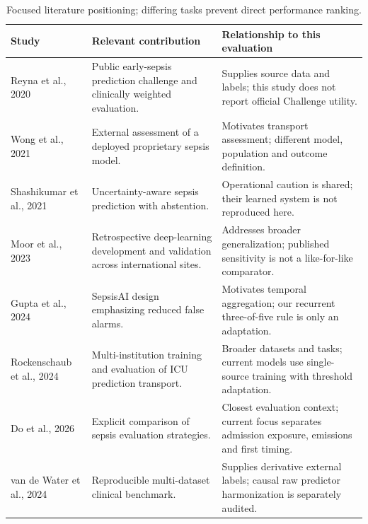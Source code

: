 \begin{table}[htbp]
\centering\small
\renewcommand{\arraystretch}{1.2}
\caption{Focused literature positioning; differing tasks prevent direct performance ranking.}\label{tab:sliterature}
\begin{tabular}{p{.19\linewidth}p{.35\linewidth}p{.36\linewidth}}
\toprule
Study & Relevant contribution & Relationship to this evaluation \\
\midrule
Reyna et al., 2020 \cite{reyna} & Public early-sepsis prediction challenge and clinically weighted evaluation. & Supplies source data and labels; this study does not report official Challenge utility. \\
Wong et al., 2021 \cite{wong} & External assessment of a deployed proprietary sepsis model. & Motivates transport assessment; different model, population and outcome definition. \\
Shashikumar et al., 2021 \cite{composer} & Uncertainty-aware sepsis prediction with abstention. & Operational caution is shared; their learned system is not reproduced here. \\
Moor et al., 2023 \cite{moor} & Retrospective deep-learning development and validation across international sites. & Addresses broader generalization; published sensitivity is not a like-for-like comparator. \\
Gupta et al., 2024 \cite{gupta} & SepsisAI design emphasizing reduced false alarms. & Motivates temporal aggregation; our recurrent three-of-five rule is only an adaptation. \\
Rockenschaub et al., 2024 \cite{rockenschaub} & Multi-institution training and evaluation of ICU prediction transport. & Broader datasets and tasks; current models use single-source training with threshold adaptation. \\
Do et al., 2026 \cite{do} & Explicit comparison of sepsis evaluation strategies. & Closest evaluation context; current focus separates admission exposure, emissions and first timing. \\
van de Water et al., 2024 \cite{yaib} & Reproducible multi-dataset clinical benchmark. & Supplies derivative external labels; causal raw predictor harmonization is separately audited. \\
\bottomrule
\end{tabular}
\end{table}
